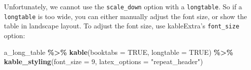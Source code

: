 \documentclass[a4paper, nobind]{templates/ociamthesis}
\newenvironment{Shaded}{\begin{snugshade}}{\end{snugshade}}
\newcommand{\AttributeTok}[1]{\textcolor[rgb]{0.13,0.29,0.53}{#1}}
\newcommand{\ConstantTok}[1]{\textcolor[rgb]{0.56,0.35,0.01}{#1}}
\newcommand{\DecValTok}[1]{\textcolor[rgb]{0.00,0.00,0.81}{#1}}
\newcommand{\FunctionTok}[1]{\textcolor[rgb]{0.13,0.29,0.53}{\textbf{#1}}}
\newcommand{\NormalTok}[1]{#1}
\newcommand{\SpecialCharTok}[1]{\textcolor[rgb]{0.81,0.36,0.00}{\textbf{#1}}}
\newcommand{\StringTok}[1]{\textcolor[rgb]{0.31,0.60,0.02}{#1}}
\renewenvironment{Shaded}
{
  \vspace{10pt}%
  \begin{snugshade}%
}{%
  \end{snugshade}%
  \vspace{8pt}%
}
\begin{document}
Unfortunately, we cannot use the \texttt{scale\_down} option with a \texttt{longtable}.
So if a \texttt{longtable} is too wide, you can either manually adjust the font size, or show the table in landscape layout.
To adjust the font size, use kableExtra's \texttt{font\_size} option:

\begin{Shaded}
\begin{Highlighting}[]
\NormalTok{a\_long\_table }\SpecialCharTok{\%\textgreater{}\%} 
  \FunctionTok{kable}\NormalTok{(}\AttributeTok{booktabs =} \ConstantTok{TRUE}\NormalTok{, }\AttributeTok{longtable =} \ConstantTok{TRUE}\NormalTok{) }\SpecialCharTok{\%\textgreater{}\%} 
  \FunctionTok{kable\_styling}\NormalTok{(}\AttributeTok{font\_size =} \DecValTok{9}\NormalTok{, }\AttributeTok{latex\_options =} \StringTok{"repeat\_header"}\NormalTok{)}
\end{Highlighting}
\end{Shaded}

\begingroup\fontsize{9}{11}\selectfont
\end{document}

